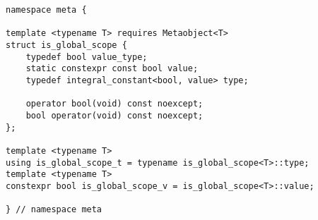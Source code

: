 
\begin{verbatim}
namespace meta {

template <typename T> requires Metaobject<T>
struct is_global_scope {
	typedef bool value_type;
	static constexpr const bool value;
	typedef integral_constant<bool, value> type;

	operator bool(void) const noexcept;
	bool operator(void) const noexcept;
};

template <typename T>
using is_global_scope_t = typename is_global_scope<T>::type;
template <typename T>
constexpr bool is_global_scope_v = is_global_scope<T>::value;

} // namespace meta
\end{verbatim}
